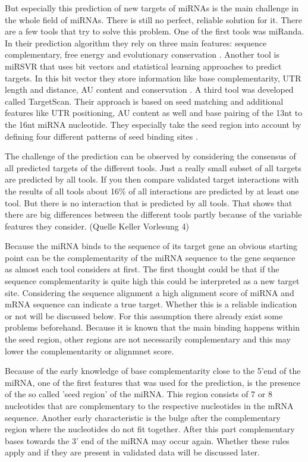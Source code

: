 \documentclass[12pt]{article}
\begin{document}
But especially this prediction of new targets of miRNAs is the main challenge in the whole field of miRNAs. There is still no perfect, reliable solution for it. There are a few tools that try to solve this problem. One of the first tools was miRanda. In their prediction algorithm they rely on three main features: sequence complementary, free energy and evolutionary conservation \cite{Enright}. Another tool is miRSVR that uses bit vectors and statistical learning approaches to predict targets. In this bit vector they store information like base complementarity, UTR length and distance, AU content and conservation \cite{Betel}. A third tool was developed called TargetScan. Their approach is based on seed matching and additional features like UTR positioning, AU content as well and base pairing of the 13nt to the 16nt miRNA nucleotide. They especially take the seed region into account by defining four different patterns of seed binding sites \cite{Lewis}.

The challenge of the prediction can be observed by considering the consensus of all predicted targets of the different tools.  Just a really small subset of all targets are predicted by all tools. If you then compare validated target interactions with the results of all tools about 16\% of all interactions are predicted by at least one tool. But there is no interaction that is predicted by all tools. That shows that there are big differences between the different tools partly because of the variable features they consider. (Quelle Keller Vorlesung 4) 

Because the miRNA binds to the sequence of its target gene an obvious starting point can be the complementarity of the miRNA sequence to the gene sequence as almost each tool considers at first. The first thought could be that if the sequence complementarity is quite high this could be interpreted as a new target site. Considering the sequence alignment a high alignment score of miRNA and mRNA sequence can indicate a true target. Whether this is a reliable indication or not will be discussed below. For this assumption there already exist some problems beforehand. Because it is known that the main binding happens within the seed region, other regions are not necessarily complementary and this may lower the complementarity or alignmnet score. 

Because of the early knowledge of base complementarity close to the 5'end of the miRNA, one of the first features that was used for the prediction, is the presence of the so called 'seed region' of the miRNA. This region consists of 7 or 8 nucleotides that are complementary to the respective nucleotides in the mRNA sequence. Another early characteristic is the bulge after the complementary region where the nucleotides do not fit together. After this part complementary bases towards the 3' end of the miRNA may occur again. Whether these rules apply and if they are present in validated data will be discussed later. 
\end{document}
